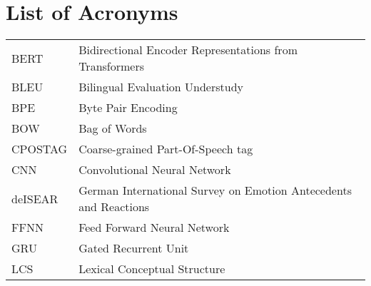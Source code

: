 {}
\chapter*{List of Acronyms}

\begin{supertabular}{lp{12.5cm}}
BERT    & Bidirectional Encoder Representations from Transformers\\
BLEU    & Bilingual Evaluation Understudy\\
BPE     & Byte Pair Encoding\\
BOW     & Bag of Words\\
CPOSTAG & Coarse-grained Part-Of-Speech tag\\
CNN     & Convolutional Neural Network\\
deISEAR & German International Survey on Emotion Antecedents and Reactions\\
FFNN    & Feed Forward Neural Network\\
GRU     & Gated Recurrent Unit\\
LCS     & Lexical Conceptual Structure\\

\end{supertabular}
